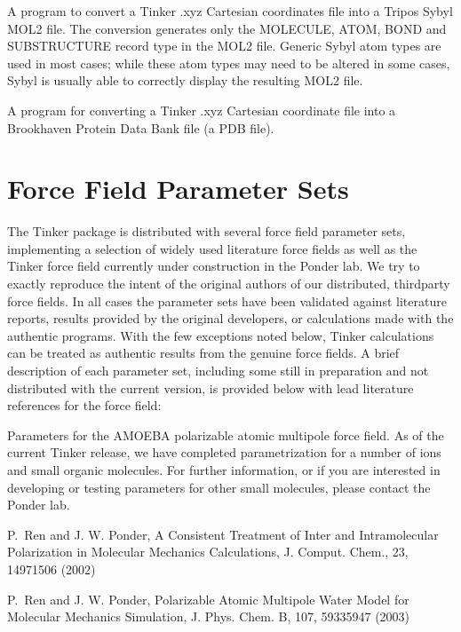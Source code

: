 \documentclass[letterpaper,11pt,english]{sphinxmanual}
\begin{document}

A program to convert a Tinker .xyz Cartesian coordinates file into a Tripos Sybyl MOL2 file. The conversion generates only the MOLECULE, ATOM, BOND and SUBSTRUCTURE record type in the MOL2 file. Generic Sybyl atom types are used in most cases; while these atom types may need to be altered in some cases, Sybyl is usually able to correctly display the resulting MOL2 file.


A program for converting a Tinker .xyz Cartesian coordinate file into a Brookhaven Protein Data Bank file (a PDB file).


\chapter{Force Field Parameter Sets}
\label{\detokenize{text/parameters:force-field-parameter-sets}}\label{\detokenize{text/parameters::doc}}
The Tinker package is distributed with several force field parameter sets, implementing a selection of widely used literature force fields as well as the Tinker force field currently under construction in the Ponder lab. We try to exactly reproduce the intent of the original authors of our distributed, third\sphinxhyphen{}party force fields. In all cases the parameter sets have been validated against literature reports, results provided by the original developers, or calculations made with the authentic programs. With the few exceptions noted below, Tinker calculations can be treated as authentic results from the genuine force fields. A brief description of each parameter set, including some still in preparation and not distributed with the current version, is provided below with lead literature references for the force field:


Parameters for the AMOEBA polarizable atomic multipole force field. As of the current Tinker release, we have completed parametrization for a number of ions and small organic molecules. For further information, or if you are interested in developing or testing parameters for other small molecules, please contact the Ponder lab.

P. Ren and J. W. Ponder, A Consistent Treatment of Inter\sphinxhyphen{} and Intramolecular Polarization in Molecular Mechanics Calculations, J. Comput. Chem., 23, 1497\sphinxhyphen{}1506 (2002)

P. Ren and J. W. Ponder, Polarizable Atomic Multipole Water Model for Molecular Mechanics Simulation, J. Phys. Chem. B, 107, 5933\sphinxhyphen{}5947 (2003)
\end{document}
